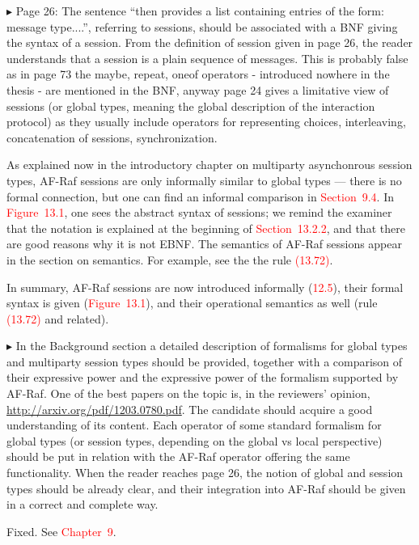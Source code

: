\documentclass{article}
\newcommand*\R[1]{\textcolor{red}{#1}} %
\newenvironment{them}%
  {\bigskip\noindent\begingroup\color{blue}$\blacktriangleright$\enspace}%
  {\endgroup\par}
\begin{document}
\begin{them}
Page 26:
The sentence ``then provides a list containing entries of the form: message
type....'', referring to sessions, should be associated with a BNF giving the
syntax of a session. From the definition of session given in page 26, the
reader understands that a session is a plain sequence of messages. This is
probably false as in page 73 the maybe, repeat, oneof operators - introduced
nowhere in the thesis - are mentioned in the BNF, anyway page 24 gives a
limitative view of sessions (or global types, meaning the global description of
the interaction protocol) as they usually include operators for representing
choices, interleaving, concatenation of sessions, synchronization. 
\end{them}

As explained now in the introductory chapter on multiparty asynchonrous session
types, AF-Raf sessions are only informally similar to global types --- there is
no formal connection, but one can find an informal comparison in
\R{Section~9.4}. In \R{Figure~13.1}, one sees the abstract syntax of sessions;
we remind the examiner that the notation is explained at the beginning of
\R{Section~13.2.2}, and that there are good reasons why it is not EBNF.  The
semantics of AF-Raf sessions appear in the section on semantics.  For example,
see the the rule \R{(13.72)}.

In summary,
  AF-Raf sessions are now introduced informally (\R{12.5}),
  their formal syntax is given (\R{Figure~13.1}),
  and their operational semantics as well (rule \R{(13.72)} and related).


\begin{them}
In the Background section a detailed description of formalisms for global types
and multiparty session types should be provided, together with a comparison of
their expressive power and the expressive power of the formalism supported by
AF-Raf. One of the best papers on the topic is, in the reviewers' opinion,
\url{http://arxiv.org/pdf/1203.0780.pdf}. The candidate should acquire a good
understanding of its content. Each operator of some standard formalism for
global types (or session types, depending on the global vs local perspective)
should be put in relation with the AF-Raf operator offering the same
functionality. When the reader reaches page 26, the notion of global and
session types should be already clear, and their integration into AF-Raf should
be given in a correct and complete way.
\end{them}
Fixed. See \R{Chapter~9}.
\end{document}
